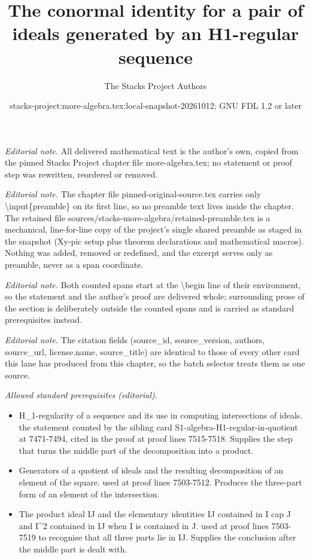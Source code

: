 \documentclass[10pt,a4paper]{amsart}
\title{The conormal identity for a pair of ideals generated by an H1-regular sequence}
\author{The Stacks Project Authors}
\date{stacks-project:more-algebra.tex:local-snapshot-20261012; GNU FDL 1.2 or later}
\theoremstyle{plain}
\theoremstyle{definition}
\theoremstyle{remark}
\numberwithin{equation}{subsection}
\begin{document}
\maketitle
\setcounter{subsection}{1}
\noindent\textit{Editorial note.} All delivered mathematical text is the author's own, copied from the pinned Stacks Project chapter file more-algebra.tex; no statement or proof step was rewritten, reordered or removed.\par\medskip
\noindent\textit{Editorial note.} The chapter file pinned-original-source.tex carries only \textbackslash{}input\{preamble\} on its first line, so no preamble text lives inside the chapter. The retained file sources/stacks-more-algebra/retained-preamble.tex is a mechanical, line-for-line copy of the project's single shared preamble as staged in the snapshot (Xy-pic setup plus theorem declarations and mathematical macros). Nothing was added, removed or redefined, and the excerpt serves only as preamble, never as a span coordinate.\par\medskip
\noindent\textit{Editorial note.} Both counted spans start at the \textbackslash{}begin line of their environment, so the statement and the author's proof are delivered whole; surrounding prose of the section is deliberately outside the counted spans and is carried as standard prerequisites instead.\par\medskip
\noindent\textit{Editorial note.} The citation fields (source\_id, source\_version, authors, source\_url, license.name, source\_title) are identical to those of every other card this lane has produced from this chapter, so the batch selector treats them as one source.\par\medskip
\noindent\textit{Allowed standard prerequisites (editorial).}\begin{itemize}
\item H\_1-regularity of a sequence and its use in computing intersections of ideals. the statement counted by the sibling card S1-algebra-H1-regular-in-quotient at 7471-7494, cited in the proof at proof lines 7515-7518. Supplies the step that turns the middle part of the decomposition into a product.
\item Generators of a quotient of ideals and the resulting decomposition of an element of the square. used at proof lines 7503-7512. Produces the three-part form of an element of the intersection.
\item The product ideal IJ and the elementary identities IJ contained in I cap J and I\textasciicircum{}2 contained in IJ when I is contained in J. used at proof lines 7503-7519 to recognise that all three parts lie in IJ. Supplies the conclusion after the middle part is dealt with.
\end{itemize}\medskip
\end{document}
